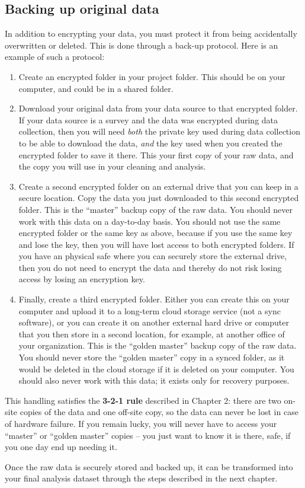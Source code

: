 \subsection{Backing up original data}
In addition to encrypting your data, you must protect it 
from being accidentally overwritten or deleted.
This is done through a back-up protocol.
Here is an example of such a protocol:

\begin{enumerate}
	\item Create an encrypted folder in your project folder.
	This should be on your computer, and could be in a shared folder.

	\item Download your original data from your data source to that encrypted folder.
	If your data source is a survey and the data was encrypted during data collection,
	then you will need \textit{both} the
	private key used during data collection to be able to download the data,
	\textit{and} the key used when you created the encrypted folder to save it there.
	This your first copy of your raw data, and the copy you will use in your cleaning and analysis.

	\item Create a second encrypted folder on an external drive that you can keep in a secure location.
	Copy the data you just downloaded to this second encrypted folder.
	This is the ``master'' backup copy of the raw data.
	You should never work with this data on a day-to-day basis.
	You should not use the same encrypted folder or the same key as above,
	because if you use the same key and lose the key,
	then you will have lost access to both encrypted folders.
	If you have an physical safe where you can securely store the external drive,
	then you do not need to encrypt the data
	and thereby do not risk losing access by losing an encryption key.

	\item Finally, create a third encrypted folder.
	Either you can create this on your computer and upload it to a long-term cloud storage service (not a sync software),
	or you can create it on	another external hard drive or computer that you then store in a second location,
	for example, at another office of your organization.
	This is the ``golden master'' backup copy of the raw data.
	You should never store the ``golden master'' copy in a synced folder,
	as it would be deleted in the cloud storage if it is deleted on your computer.
	You should also never work with this data;
	it exists only for recovery purposes.
\end{enumerate}

\noindent This handling satisfies the \textbf{3-2-1 rule} described in Chapter 2:
there are two on-site copies of the data and one off-site copy,
so the data can never be lost in case of hardware failure.
If you remain lucky, you will never have to access your ``master'' or ``golden master'' copies --
you just want to know it is there, safe, if you one day end up needing it.

Once the raw data is securely stored and backed up,
it can be transformed into your final analysis dataset
through the steps described in the next chapter.
